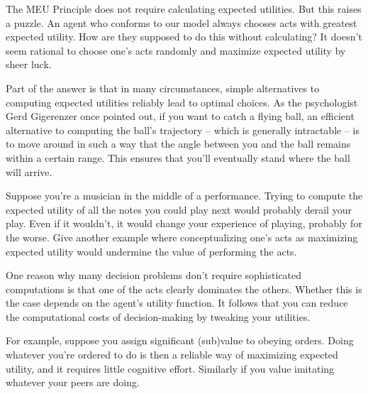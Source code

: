 The MEU Principle does not require calculating expected utilities. But this
raises a puzzle. An agent who conforms to our model always chooses acts with
greatest expected utility. How are they supposed to do this without calculating?
It doesn't seem rational to choose one's acts randomly and maximize expected
utility by sheer luck.

Part of the answer is that in many circumstances, simple alternatives to
computing expected utilities reliably lead to optimal choices. As the
psychologist Gerd Gigerenzer once pointed out, if you want to catch a flying
ball, an efficient alternative to computing the ball's trajectory -- which is
generally intractable -- is to move around in such a way that the angle between
you and the ball remains within a certain range. This ensures that you'll
eventually stand where the ball will arrive.


%

\begin{exercise}{1}
  Suppose you're a musician in the middle of a performance. Trying to compute
  the expected utility of all the notes you could play next would probably
  derail your play. Even if it wouldn't, it would change your experience of
  playing, probably for the worse. Give another example where conceptualizing
  one's acts as maximizing expected utility would undermine the value of
  performing the acts.
\end{exercise}

One reason why many decision problems don't require sophisticated computations
is that one of the acts clearly dominates the others. Whether this is the
case depends on the agent's utility function. It follows that you can reduce the
computational costs of decision-making by tweaking your utilities.

For example, suppose you assign significant (sub)value to obeying orders. Doing
whatever you're ordered to do is then a reliable way of maximizing expected
utility, and it requires little cognitive effort. Similarly if you value
imitating whatever your peers are doing.

